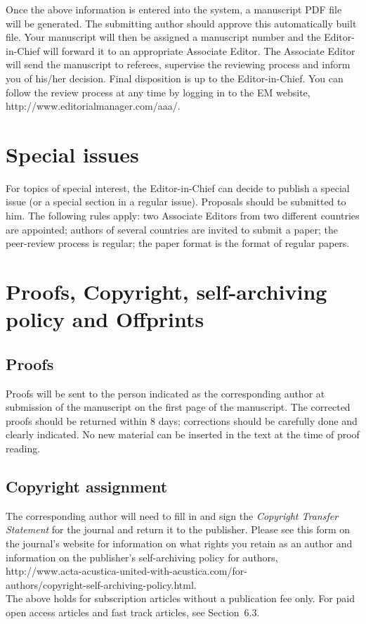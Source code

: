 \documentclass[twocolumn]{article}
\begin{document}
Once the above information is entered into the system, a manuscript PDF
file will be generated. The submitting author should approve this
automatically built file. Your manuscript will then be assigned a
manuscript number and the Editor-in-Chief will forward it to an
appropriate Associate Editor. The Associate Editor will send the
manuscript to referees, supervise the reviewing process and inform you
of his/her decision. Final disposition is up to the Editor-in-Chief. You
can follow the review process at any time by logging in to the EM
website, http://www.editorialmanager.com/aaa/.


\section{Special issues}

For topics of special interest, the Editor-in-Chief can decide to
publish a special issue (or a special section in a regular issue).
Proposals should be submitted to him. The following rules apply: two
Associate Editors from two different countries are appointed; authors of
several countries are invited to submit a paper; the peer-review process
is regular; the paper format is the format of regular papers.


\section{Proofs, Copyright, self-archiving policy and Offprints}

\subsection{Proofs}

Proofs will be sent to the person indicated as the corresponding author
at submission of the manuscript on the first page of the manuscript. The
corrected proofs should be returned within 8 days; corrections should be
carefully done and clearly indicated. No new material can be inserted in
the text at the time of proof reading.

\subsection{Copyright assignment}

The corresponding author will need to fill in and sign the
{\em Copyright Transfer Statement} for the journal and return it to the
publisher. Please see this form on the journal's website for information
on what rights you retain as an author and information on the
publisher's self-archiving policy for authors, \\
http://www.acta-acustica-united-with-acustica.com/for- \\
\hspace*{24pt}authors/copyright-self-archiving-policy.html. \\
The above holds for subscription articles without a publication fee
only. For paid open access articles and fast track articles, see
Section~6.3.
\end{document}
